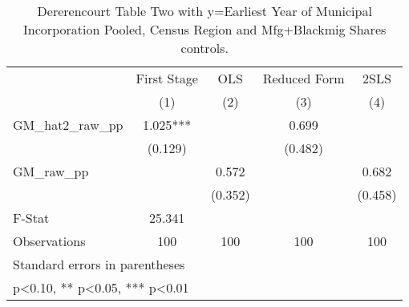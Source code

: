 \begin{table}[htbp]\centering
\def\sym#1{\ifmmode^{#1}\else\(^{#1}\)\fi}
\caption{Dererencourt Table Two with y=Earliest Year of Municipal Incorporation  Pooled, Census Region and Mfg+Blackmig Shares controls.}
\begin{tabular}{l*{4}{c}}
\toprule
                    & First Stage   &         OLS   &Reduced Form   &        2SLS   \\
                    &\multicolumn{1}{c}{(1)}   &\multicolumn{1}{c}{(2)}   &\multicolumn{1}{c}{(3)}   &\multicolumn{1}{c}{(4)}   \\
\midrule
GM\_hat2\_raw\_pp      &       1.025***&               &       0.699   &               \\
                    &     (0.129)   &               &     (0.482)   &               \\
\addlinespace
GM\_raw\_pp           &               &       0.572   &               &       0.682   \\
                    &               &     (0.352)   &               &     (0.458)   \\
\midrule
F-Stat              &      25.341   &               &               &               \\
Observations        &         100   &         100   &         100   &         100   \\
\bottomrule
\multicolumn{5}{l}{\footnotesize Standard errors in parentheses}\\
\multicolumn{5}{l}{\footnotesize * p<0.10, ** p<0.05, *** p<0.01}\\
\end{tabular}
\end{table}
